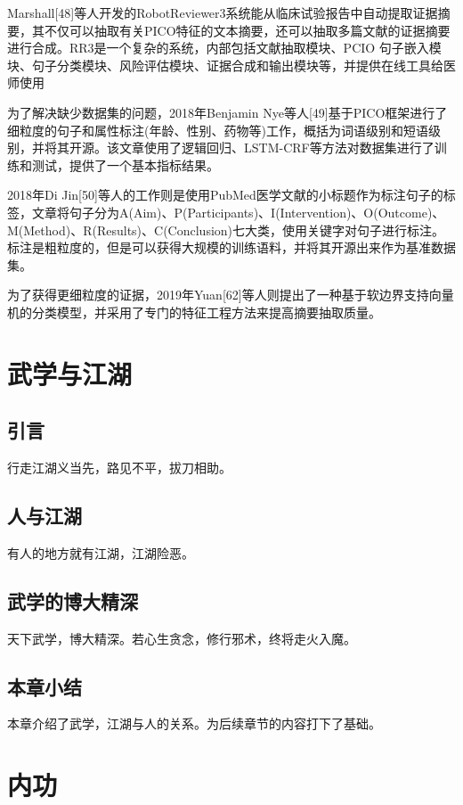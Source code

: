 \documentclass[algorithmlist, figurelist,tablelist, nomlist,masters]{seuthesix}
\begin{document}
Marshall[48]等人开发的RobotReviewer3系统能从临床试验报告中自动提取证据摘要，其不仅可以抽取有关PICO特征的文本摘要，还可以抽取多篇文献的证据摘要进行合成。RR3是一个复杂的系统，内部包括文献抽取模块、PCIO 句子嵌入模块、句子分类模块、风险评估模块、证据合成和输出模块等，并提供在线工具给医师使用 

为了解决缺少数据集的问题，2018年Benjamin Nye等人[49]基于PICO框架进行了细粒度的句子和属性标注(年龄、性别、药物等)工作，概括为词语级别和短语级别，并将其开源。该文章使用了逻辑回归、LSTM-CRF等方法对数据集进行了训练和测试，提供了一个基本指标结果。 

2018年Di Jin[50]等人的工作则是使用PubMed医学文献的小标题作为标注句子的标签，文章将句子分为A(Aim)、P(Participants)、I(Intervention)、O(Outcome)、M(Method)、R(Results)、C(Conclusion)七大类，使用关键字对句子进行标注。标注是粗粒度的，但是可以获得大规模的训练语料，并将其开源出来作为基准数据集。

为了获得更细粒度的证据，2019年Yuan[62]等人则提出了一种基于软边界支持向量机的分类模型，并采用了专门的特征工程方法来提高摘要抽取质量。



\chapter{武学与江湖}

\section{引言}
行走江湖义当先，路见不平，拔刀相助。

\section{人与江湖}
有人的地方就有江湖，江湖险恶。

\section{武学的博大精深}
天下武学，博大精深。若心生贪念，修行邪术，终将走火入魔。

\section{本章小结}
本章介绍了武学，江湖与人的关系。为后续章节的内容打下了基础。

\chapter{内功}
\end{document}
